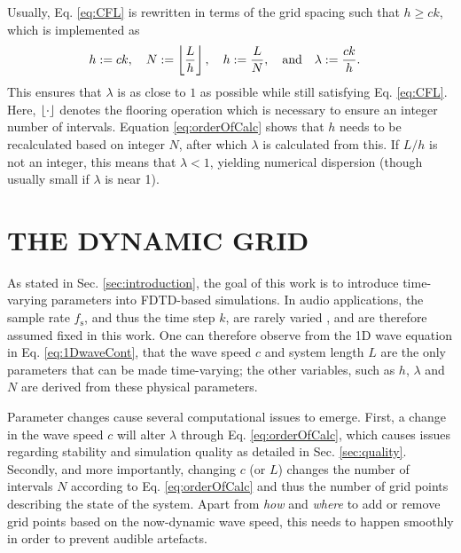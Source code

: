 \documentclass[fleqn]{jaes}
\begin{document}
Usually, Eq. \eqref{eq:CFL} is rewritten in terms of the grid spacing such that $h \geq c k$,
which is implemented as
\begin{equation}\label{eq:orderOfCalc}
    \!\!\!\!\!h:=ck, \quad N := \floor[\frac{L}{h}],\quad h := \frac{L}{N},\qaq \lambda := \frac{ck}{h}.
\end{equation}
This ensures that $\lambda$ is as close to $1$ as possible while still satisfying Eq. \eqref{eq:CFL}. Here, $\floor[\cdot]$ denotes the flooring operation which is necessary to ensure an integer number of intervals. Equation \eqref{eq:orderOfCalc} shows that $h$ needs to be recalculated based on integer $N$, after which $\lambda$ is calculated from this. If $L/h$ is not an integer, this means that $\lambda < 1$, yielding numerical dispersion (though usually small if $\lambda$ is near 1).

\section{THE DYNAMIC GRID}\label{sec:dynamicGrid}
As stated in Sec. \ref{sec:introduction}, the goal of this work is to introduce time-varying parameters into FDTD-based simulations. In audio applications, the sample rate $f_\text{s}$, and thus the time step $k$, are rarely varied \cite{Bilbao2009}, and are therefore assumed fixed in this work. One can therefore observe from the 1D wave equation in Eq. \eqref{eq:1DwaveCont}, that the wave speed $c$ and system length $L$ are the only parameters that can be made time-varying; the other variables, such as $h$, $\lambda$ and $N$ are derived from these physical parameters. 

Parameter changes cause several computational issues to emerge. 
First, a change in the wave speed $c$ will alter $\lambda$ through Eq. \eqref{eq:orderOfCalc}, which causes issues regarding stability and simulation quality as detailed in Sec. \ref{sec:quality}. Secondly, and more importantly, changing $c$ (or $L$) changes the number of intervals $N$ according to Eq. \eqref{eq:orderOfCalc} and thus the number of grid points describing the state of the system. Apart from \textit{how} and \textit{where} to add or remove grid points based on the now-dynamic wave speed, this needs to happen smoothly in order to prevent audible artefacts. %
\end{document}
